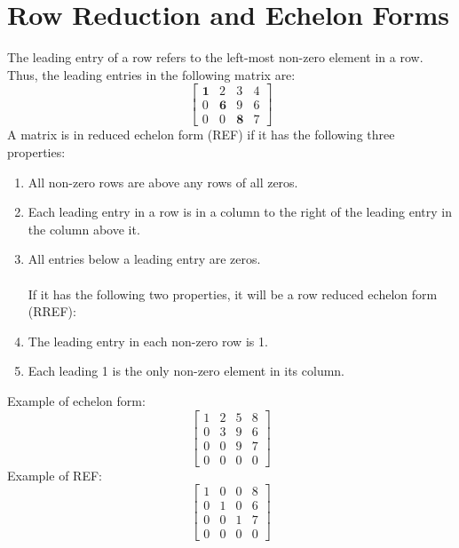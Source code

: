 \documentclass[nobib]{tufte-handout}
\begin{document}
\section{Row Reduction and Echelon Forms}
The leading entry of a row refers to the left-most non-zero element in a row.
Thus, the leading entries in the following matrix are:
\begin{equation*}
    \begin{bmatrix}
        \mathbf{1} & 2          & 3          & 4 \\
        0          & \mathbf{6} & 9          & 6 \\
        0          & 0          & \mathbf{8} & 7
    \end{bmatrix}
\end{equation*}
A matrix is in reduced echelon form (REF) if it has the following three properties:
\begin{enumerate}
    \item All non-zero rows are above any rows of all zeros.
    \item Each leading entry in a row is in a column to the right of the leading entry in
          the column above it.
    \item All entries below a leading entry are zeros.\\~\\ If it has the following two
          properties, it will be a row reduced echelon form (RREF):
    \item The leading entry in each non-zero row is 1.
    \item Each leading 1 is the only non-zero element in its column.
\end{enumerate}
Example of echelon form:
\begin{equation*}
    \begin{bmatrix}
        1 & 2 & 5 & 8 \\
        0 & 3 & 9 & 6 \\
        0 & 0 & 9 & 7 \\
        0 & 0 & 0 & 0
    \end{bmatrix}
\end{equation*}
Example of REF:
\begin{equation*}
    \begin{bmatrix}
        1 & 0 & 0 & 8 \\
        0 & 1 & 0 & 6 \\
        0 & 0 & 1 & 7 \\
        0 & 0 & 0 & 0
    \end{bmatrix}
\end{equation*}
\end{document}
